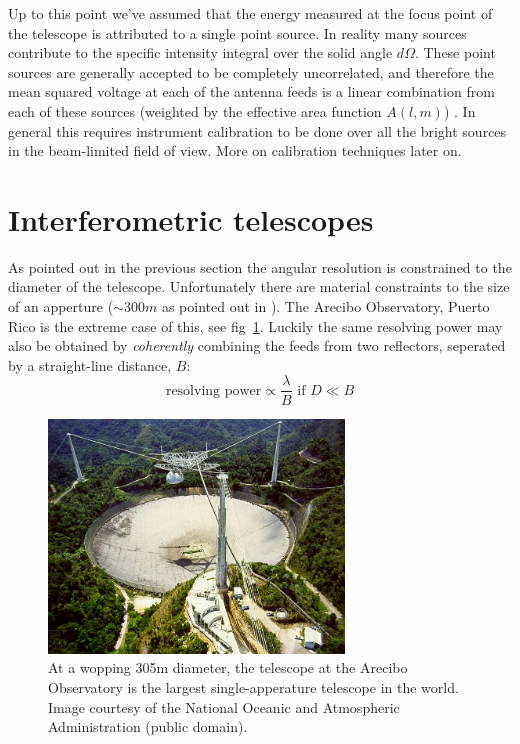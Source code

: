 \documentclass[a4paper,10pt]{report}
\begin{document}
Up to this point we've assumed that the energy measured at the focus point of the telescope is attributed to a single point source. In reality many sources contribute to the specific intensity integral over the solid angle $d\Omega$. These point sources
are generally accepted to be completely uncorrelated, and therefore the mean squared voltage at each of the antenna feeds is a linear combination from each of these sources (weighted by the effective area function $A(l,m)$) \cite{christiansenradiotelescopes}. In general this requires instrument 
calibration to be done over all the bright sources in the beam-limited field of view. More on calibration techniques later on.

\section{Interferometric telescopes}
As pointed out in the previous section the angular resolution is constrained to the diameter of the telescope. Unfortunately there are material constraints to the size of an apperture ($\sim 300m$ as pointed out in \cite{wilson2009tools}). The Arecibo Observatory, Puerto Rico is the extreme case 
of this, see fig~\ref{fig_arecibo}. Luckily the same resolving power may also be obtained by \textit{coherently} combining the feeds from two reflectors, seperated by a straight-line distance, $B$:
\begin{equation*}
 \text{resolving power} \propto \frac{\lambda}{B} \text{ if } D\ll B
\end{equation*}
\begin{figure}[ht]
 \begin{mdframed}
 \centering
 \includegraphics[width=0.7\textwidth]{images/arecibo.jpg}
 \caption[Arecibo Observatory]{At a wopping 305m diameter, the telescope at the Arecibo Observatory is the largest single-apperature telescope in the world. Image courtesy of the National Oceanic and Atmospheric Administration (public domain).}
  \label{fig_arecibo}
 \end{mdframed}
\end{figure}
\end{document}
